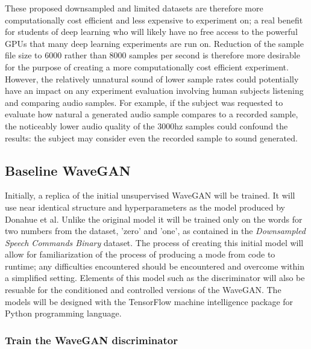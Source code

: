 \documentclass[a4paper, titlepage]{article}
\begin{document}
These proposed downsampled and limited datasets are therefore more computationally cost efficient and less expensive to experiment on; a real benefit for students of deep learning who will likely have no free access to the powerful GPUs that many deep learning experiments are run on.
\newline
\newline
Reduction of the sample file size to 6000 rather than 8000 samples per second is therefore more desirable for the purpose of creating a more computationally cost efficient experiment.
However, the relatively unnatural sound of lower sample rates could potentially have an impact on any experiment evaluation involving human subjects listening and comparing audio samples.
For example, if the subject was requested to evaluate how natural a generated audio sample compares to a recorded sample, the noticeably lower audio quality of the 3000hz samples could confound the results: the subject may consider even the recorded sample to sound generated.

\subsection{Baseline WaveGAN}

Initially, a replica of the initial unsupervised WaveGAN will be trained.
It will use near identical structure and hyperparameters as the model produced by Donahue et al.
Unlike the original model it will be trained only on the words for two numbers from the dataset, 'zero' and 'one', as contained in the \textit{Downsampled Speech Commands Binary} dataset.
\newline
\newline
The process of creating this initial model will allow for familiarization of the process of producing a mode from code to runtime; any difficulties encountered should be encountered and overcome within a simplified setting.
Elements of this model such as the discriminator will also be resuable for the conditioned and controlled versions of the WaveGAN.
\newline
\newline
The models will be designed with the TensorFlow machine intelligence package for Python programming language.

\subsubsection{Train the WaveGAN discriminator}
\end{document}
